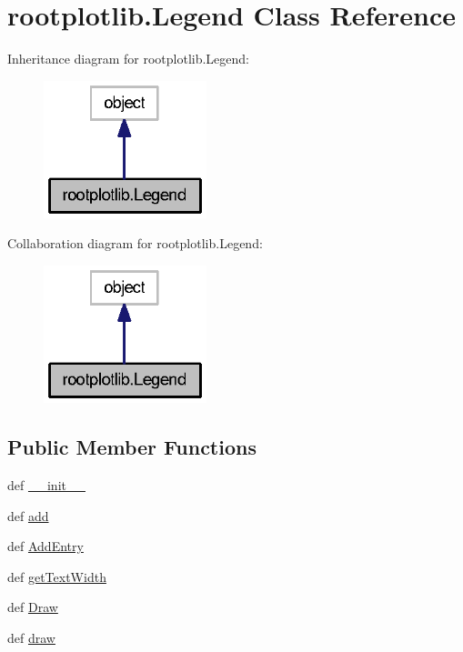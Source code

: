 \section{rootplotlib.\-Legend Class Reference}
\label{classrootplotlib_1_1Legend}


Inheritance diagram for rootplotlib.\-Legend\-:
\nopagebreak
\begin{figure}[H]
\begin{center}
\leavevmode
\includegraphics[width=134pt]{classrootplotlib_1_1Legend__inherit__graph}
\end{center}
\end{figure}


Collaboration diagram for rootplotlib.\-Legend\-:
\nopagebreak
\begin{figure}[H]
\begin{center}
\leavevmode
\includegraphics[width=134pt]{classrootplotlib_1_1Legend__coll__graph}
\end{center}
\end{figure}
\subsection*{Public Member Functions}
\begin{DoxyCompactItemize}
\item 
def \hyperlink{classrootplotlib_1_1Legend_a99e09577efdd3142c44c8e2201445a16}{\-\_\-\-\_\-init\-\_\-\-\_\-}
\item 
def \hyperlink{classrootplotlib_1_1Legend_a8386b509213bd0f88810b20e4c3b9e04}{add}
\item 
def \hyperlink{classrootplotlib_1_1Legend_a53fae040d3e9ed0a8b085238d0d5e766}{Add\-Entry}
\item 
def \hyperlink{classrootplotlib_1_1Legend_a5322e4838ffe9d9ca631d74313d7bd1a}{get\-Text\-Width}
\item 
def \hyperlink{classrootplotlib_1_1Legend_a1e8a9d27996f878a369195f533565f40}{Draw}
\item 
def \hyperlink{classrootplotlib_1_1Legend_a12f520ccbccf5ea7cc716e1693bff06f}{draw}
\end{DoxyCompactItemize}
